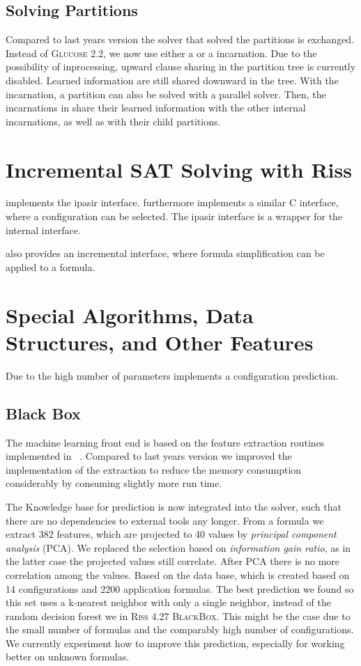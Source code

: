 \documentclass[conference]{IEEEtran}
\begin{document}
\subsection{Solving Partitions}

Compared to last years version the solver that solved the partitions is exchanged. 
Instead of \textsc{Glucose 2.2}, we now use either a \riss or a \priss incarnation. 
Due to the possibility of inprocessing, upward clause sharing in the partition tree is currently disabled. 
Learned information are still shared downward in the tree. 
With the \priss incarnation, a partition can also be solved with a parallel solver. 
Then, the incarnations in \priss share their learned information with the other internal incarnations, as well as with their child partitions.

\section{Incremental SAT Solving with Riss}

\riss implements the ipasir interface. 
\riss furthermore implements a similar C interface, where a configuration can be selected. 
The ipasir interface is a wrapper for the internal interface. 

\coprocessor also provides an incremental interface, where formula simplification can be applied to a formula.

\section{Special Algorithms, Data Structures, and Other Features}

Due to the high number of parameters \riss implements a configuration prediction. 

\subsection{Black Box}

The machine learning front end is based on the feature extraction routines implemented in \riss~\cite{Mblackbox}. 
Compared to last years version we improved the implementation of the extraction to reduce the memory consumption considerably by consuming slightly more run time. 

The Knowledge base for prediction is now integrated into the solver, such that there are no dependencies to external tools any longer. 
From a formula we extract 382 features, which are projected to 40 values by \emph{principal component analysis} (PCA). 
We replaced the selection based on \emph{information gain ratio}, as in the latter case the projected values still correlate. 
After PCA there is no more correlation among the values. 
Based on the data base, which is created based on 14 configurations and 2200 application formulas. 
The best prediction we found so this set uses a k-nearest neighbor with only a single neighbor, instead of the random decision forest we in \textsc{Riss 4.27 BlackBox}.  
This might be the case due to the small number of formulas and the comparably high number of configurations. 
We currently experiment how to improve this prediction, especially for working better on unknown formulas. 
\end{document}
